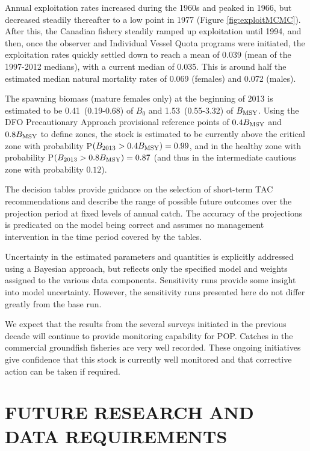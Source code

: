 Annual exploitation rates increased during the 1960s and peaked in 1966, but decreased steadily thereafter to a low point in 1977 (Figure \ref{fig:exploitMCMC}). After this, the Canadian fishery steadily ramped up exploitation until 1994, and then, once the observer and Individual Vessel Quota programs were initiated, the exploitation rates quickly settled down to reach a mean of 0.039 (mean of the 1997-2012 medians), with a current median of 0.035. This is around half the estimated median natural mortality rates of 0.069 (females) and 0.072 (males).

The spawning biomass (mature females only) at the beginning of 2013 is estimated to be 0.41~(0.19-0.68) of $B_0$ and 1.53~(0.55-3.32) of $B_\mathrm{MSY}$. Using the DFO Precautionary Approach provisional reference points of $0.4 B_\mathrm{MSY}$ and $0.8 B_\mathrm{MSY}$ to define zones, the stock is estimated to be currently above the critical zone with probability P$(B_{2013} > 0.4 B_\mathrm{MSY}) = 0.99$, and in the healthy zone with probability P$(B_{2013} > 0.8 B_\mathrm{MSY}) = 0.87$ (and thus in the intermediate cautious zone with probability $0.12$).


The decision tables provide guidance on the selection of short-term TAC recommendations and describe the range of possible future outcomes over the projection period at fixed levels of annual catch. The accuracy of the projections is predicated on the model being correct and assumes no management intervention in the time period covered by the tables.

Uncertainty in the estimated parameters and quantities is explicitly addressed using a Bayesian approach, but reflects only the specified model and weights assigned to the various data components.  Sensitivity runs provide some insight into model uncertainty.  However, the sensitivity runs presented here do not differ greatly from the base run.

We expect that the results from the several surveys initiated in the previous decade will continue to provide monitoring capability for POP. Catches in the commercial groundfish fisheries are very well recorded. These ongoing initiatives give confidence that this stock is currently well monitored and that corrective action can be taken if required.


\section{FUTURE RESEARCH AND DATA REQUIREMENTS}

